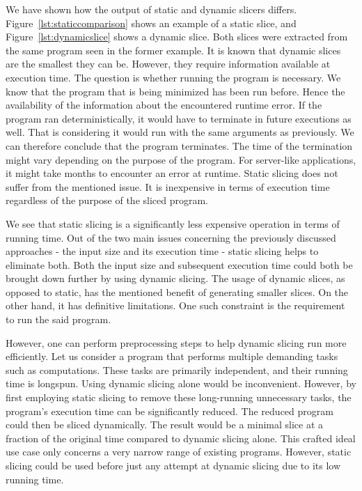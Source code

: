We have shown how the output of static and dynamic slicers differs. 
Figure~\ref{lst:staticcomparison} shows an example of a static slice, 
and Figure~\ref{lst:dynamicslice} shows a dynamic slice. 
Both slices were extracted from the same program seen in the former example.
It is known that dynamic slices are the smallest they can be. 
However, they require information available at execution time. 
The question is whether running the program is necessary. 
We know that the program that is being minimized has been run before. 
Hence the availability of the information about the encountered runtime 
error. 
If the program ran deterministically, it would have to terminate in future 
executions as well.  
That is considering it would run with the same arguments as previously.  
We can therefore conclude that the program terminates.  
The time of the termination might vary depending on the purpose of 
the program.  
For server-like applications, it might take months to encounter an error 
at runtime. 
Static slicing does not suffer from the mentioned issue.  
It is inexpensive in terms of execution time regardless of the purpose of 
the sliced program. 

We see that static slicing is a significantly less expensive operation in 
terms of running time. 
Out of the two main issues concerning the previously discussed 
approaches - the input size and its execution time - static slicing helps to 
eliminate both. 
Both the input size and subsequent execution time could both be brought down 
further by using dynamic slicing.  
The usage of dynamic slices, as opposed to static, has the mentioned benefit 
of generating smaller slices.
On the other hand, it has definitive limitations. 
One such constraint is the requirement to run the said program. 

However, one can perform preprocessing steps to help dynamic slicing run more 
efficiently.  
Let us consider a program that performs multiple demanding tasks such as 
computations.  
These tasks are primarily independent, and their running time is longspun.  
Using dynamic slicing alone would be inconvenient.  
However, by first employing static slicing to remove these long-running 
unnecessary tasks, the program's execution time can be significantly reduced.  
The reduced program could then be sliced dynamically.  
The result would be a minimal slice at a fraction of the original time 
compared to dynamic slicing alone. 
This crafted ideal use case only concerns a very narrow range of existing 
programs.  
However, static slicing could be used before just any attempt at dynamic 
slicing due to its low running time. 

